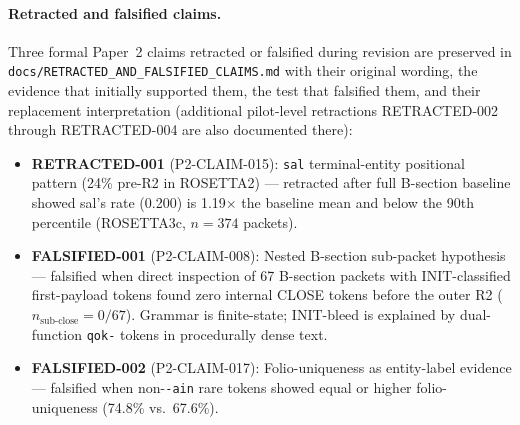\documentclass[11pt,a4paper,twocolumn]{article}
\begin{document}
\paragraph{Retracted and falsified claims.}
Three formal Paper~2 claims retracted or falsified during revision are preserved in \texttt{docs/RETRACTED\_AND\_FALSIFIED\_CLAIMS.md} with their original wording, the evidence that initially supported them, the test that falsified them, and their replacement interpretation (additional pilot-level retractions RETRACTED-002 through RETRACTED-004 are also documented there):
\begin{itemize}[noitemsep]
  \item \textbf{RETRACTED-001} (P2-CLAIM-015): \texttt{sal} terminal-entity positional pattern (24\% pre-R2 in ROSETTA2) --- retracted after full B-section baseline showed sal's rate (0.200) is 1.19$\times$ the baseline mean and below the 90th percentile (ROSETTA3c, $n = 374$ packets).
  \item \textbf{FALSIFIED-001} (P2-CLAIM-008): Nested B-section sub-packet hypothesis --- falsified when direct inspection of 67 B-section packets with INIT-classified first-payload tokens found zero internal CLOSE tokens before the outer R2 ($n_{\text{sub-close}} = 0/67$). Grammar is finite-state; INIT-bleed is explained by dual-function \texttt{qok-} tokens in procedurally dense text.
  \item \textbf{FALSIFIED-002} (P2-CLAIM-017): Folio-uniqueness as entity-label evidence --- falsified when non-\texttt{-ain} rare tokens showed equal or higher folio-uniqueness (74.8\% vs.\ 67.6\%).
\end{itemize}
\end{document}
